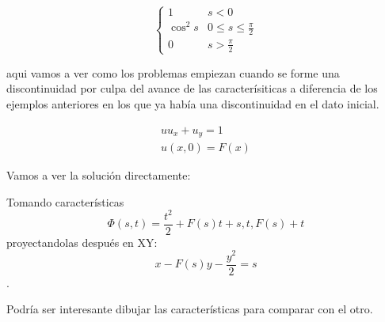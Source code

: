 	\[
	\begin{cases}
	1 & s < 0 \\
	\cos^2 s & 0 \leq s \leq \frac{\pi}{2} \\
	0 & s > \frac{\pi}{2}
	\end{cases}
	\]

	aqui vamos a ver como los problemas empiezan cuando se forme una discontinuidad por culpa del avance de las caracterísiticas a diferencia de los ejemplos anteriores en los que ya había una discontinuidad en el dato inicial.

	\begin{example}{2}

		\[
		\begin{array}{l}
			u u_x + u_y = 1 \\
			u(x,0) = F(x)
		\end{array}
		\]

		Vamos a ver la solución directamente:

		Tomando características \[ \Phi(s,t) = \frac{t^2}{2} + F(s) t + s, t, F(s) + t \] proyectandolas después en XY: \[ x - F(s)y - \frac{y^2}{2} = s \].

		Podría ser interesante dibujar las características para comparar con el otro.

	\end{example}

